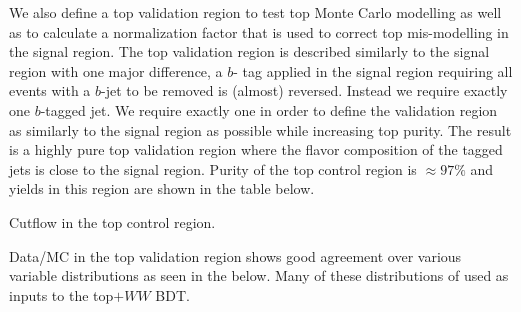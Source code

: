 We also define a top validation region to test top Monte Carlo modelling as well as to calculate a normalization factor that is used to correct top mis-modelling in the signal region. The top validation region is described similarly to the signal region with one major difference, a $b$- tag applied in the signal region requiring all events with a $b$-jet to be removed is (almost) reversed. Instead we require exactly one $b$-tagged jet. We require exactly one in order to define the validation region as similarly to the signal region as possible while increasing top purity. The result is a highly pure top validation region where the flavor composition of the tagged jets is close to the signal region. Purity of the top control region is $\approx 97\%$ and yields in this region are shown in the table below.

\begin{table}[h!]
\scalebox{0.35}{

}
\caption{Cutflow in the top control region.}
\label{tab:topcr}
\end{table}

Data/MC in the top validation region shows good agreement over various variable distributions as seen in the  below. Many of these distributions of used as inputs to the top$+WW$ BDT. 

